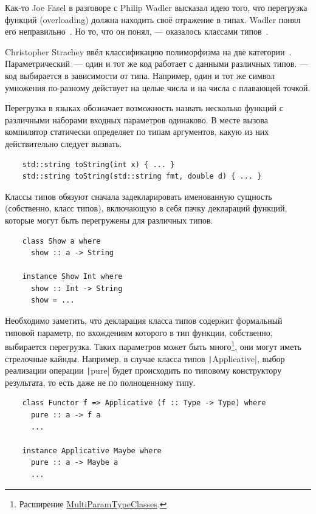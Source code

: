 
Как-то Joe Fasel в разговоре с Philip Wadler высказал идею того, что перегрузка функций (overloading) должна находить своё отражение в типах.
Wadler понял его неправильно~\cite{hudak2007history}.
Но то, что он понял, --- оказалось классами типов~\cite{wadler1989make}.

Christopher Strachey ввёл классификацию полиморфизма на две категории~\cite{strachey2000fundamental}.
Параметрический~--- один и тот же код работает с данными различных типов.
 --- код выбирается в зависимости от типа.
Например, один и тот же символ умножения по-разному действует на целые числа и на числа с плавающей точкой.

Перегрузка в языках обозначает возможность назвать несколько функций с различными наборами входных параметров одинаково.
В месте вызова компилятор статически определяет по типам аргументов, какую из них действительно следует вызвать.
\begin{verbatim}
    std::string toString(int x) { ... }
    std::string toString(std::string fmt, double d) { ... }
\end{verbatim}

Классы типов обязуют сначала задекларировать именованную сущность (собственно, класс типов), включающую в себя пачку деклараций функций, которые могут быть перегружены для различных типов.
\begin{verbatim}
    class Show a where
      show :: a -> String

    instance Show Int where
      show :: Int -> String
      show = ...
\end{verbatim}

Необходимо заметить, что декларация класса типов содержит формальный типовой параметр, по вхождениям которого в тип функции, собственно, выбирается перегрузка.
Таких параметров может быть много\footnote{Расширение \href{https://ghc.gitlab.haskell.org/ghc/doc/users_guide/exts/multi_param_type_classes.html}{MultiParamTypeClasses}.}, они могут иметь стрелочные кайнды.
Например, в случае класса типов \texttt|Applicative|, выбор реализации операции \texttt|pure| будет происходить по типовому конструктору результата, то есть даже не по полноценному типу.
\begin{verbatim}
    class Functor f => Applicative (f :: Type -> Type) where
      pure :: a -> f a
      ...

    instance Applicative Maybe where
      pure :: a -> Maybe a
      ...
\end{verbatim}

